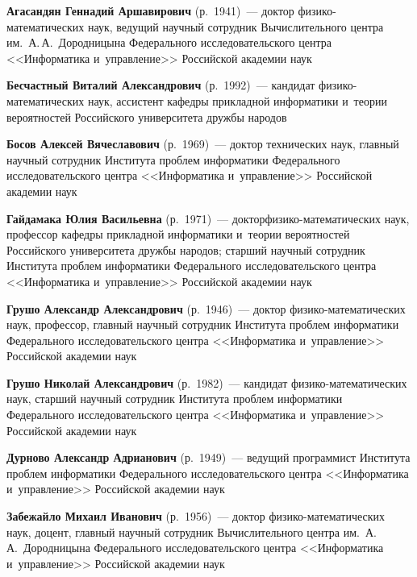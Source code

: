 \begin{multicols}{2}



\noindent
\textbf{Агасандян Геннадий Аршавирович} (р.\ 1941)~--- 
доктор фи\-зи\-ко-ма\-те\-ма\-ти\-че\-ских наук, ведущий научный со\-труд\-ник 
Вы\-чис\-ли\-тель\-но\-го цент\-ра им.\ А.\,А.~Дородницына Федерального исследовательского цент\-ра 
<<Информатика и~управ\-ле\-ние>> Российской академии наук

\noindent
\textbf{Бесчастный Виталий Александрович} (р.\ 1992)~--- кандидат 
фи\-зи\-ко-ма\-те\-ма\-ти\-че\-ских наук, ассистент ка\-фед\-ры при\-клад\-ной 
информатики и~тео\-рии вероятностей Российского университета друж\-бы народов

\noindent
\textbf{Босов Алексей Вячеславович} (р.\ 1969)~--- 
доктор технических наук, главный научный со\-труд\-ник Института проб\-лем 
информатики Федерального исследовательского цент\-ра <<Информатика и~управ\-ле\-ние>>
 Российской академии наук
 
\noindent
\textbf{Гайдамака Юлия Васильевна} (р.\ 1971)~--- 
доктор\linebreak фи\-зи\-ко-ма\-те\-ма\-ти\-че\-ских наук, профессор ка\-фед\-ры при\-клад\-ной информатики 
и~тео\-рии вероятностей Российского университета друж\-бы народов; старший научный сотрудник 
Института \mbox{проб\-лем} информатики Федерального исследовательского цент\-ра 
<<Информатика и~управ\-ле\-ние>> Российской академии наук
 
\noindent
\textbf{Грушо Александр Александрович} (р.\ 1946)~--- 
доктор фи\-зи\-ко-ма\-те\-ма\-ти\-че\-ских наук, профессор, главный научный сотрудник Института проб\-лем 
информатики Федерального исследовательского цент\-ра <<Информатика и~управ\-ле\-ние>> Российской академии наук

\noindent
\textbf{Грушо Николай Александрович} (р.\ 1982)~--- 
кандидат фи\-зи\-ко-ма\-те\-ма\-ти\-че\-ских наук, старший научный сотрудник Института проб\-лем 
информатики Федерального исследовательского цент\-ра <<Информатика и~управ\-ле\-ние>> Российской академии наук
 
\noindent
\textbf{Дурново Александр Адрианович} (р.\ 1949)~--- 
ведущий программист Института проб\-лем информатики Федерального исследовательского цент\-ра 
<<Информатика и~управ\-ле\-ние>> Российской академии наук

\noindent
\textbf{Забежайло Михаил Иванович} (р.\ 1956)~--- доктор фи\-зи\-ко-ма\-те\-ма\-ти\-че\-ских наук, 
доцент, главный научный сотрудник Вычислительного цент\-ра им.\ А.\,А.~Дородницына 
Федерального исследовательского цент\-ра <<Информатика и~управ\-ле\-ние>> Российской академии наук


\end{multicols}
